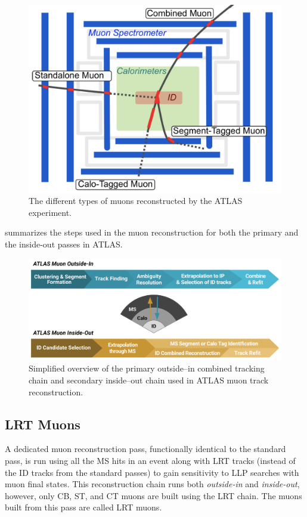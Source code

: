 \begin{figure}[!ht]
    \centering
    \includegraphics[width=0.8\linewidth]{figures//experiment/muonTypes.png}
    \caption{The different types of muons reconstructed by the ATLAS experiment.~\cite{Rettie:20188X}}
    \label{fig:muon-types}
\end{figure}


 summarizes the steps used in the muon reconstruction for both the primary and the inside-out passes in ATLAS.

\begin{figure}[!ht]
    \centering
    \includegraphics[width=0.8\linewidth]{figures//experiment/muonSteps.png}
    \caption{Simplified overview of the primary outside--in combined tracking chain and secondary inside--out chain used in ATLAS muon track reconstruction.~\cite{atlascollaboration2023software}}
    \label{fig:muon-steps}
\end{figure}

\subsection*{LRT Muons}
A dedicated muon reconstruction pass, functionally identical to the standard pass, is run using all the MS hits in an event along with LRT tracks (instead of the ID tracks from the standard passes) to gain sensitivity to LLP searches with muon final states. This reconstruction chain runs both \textit{outside-in} and \textit{inside-out}, however, only CB, ST, and CT muons are built using the LRT chain. The muons built from this pass are called LRT muons.

